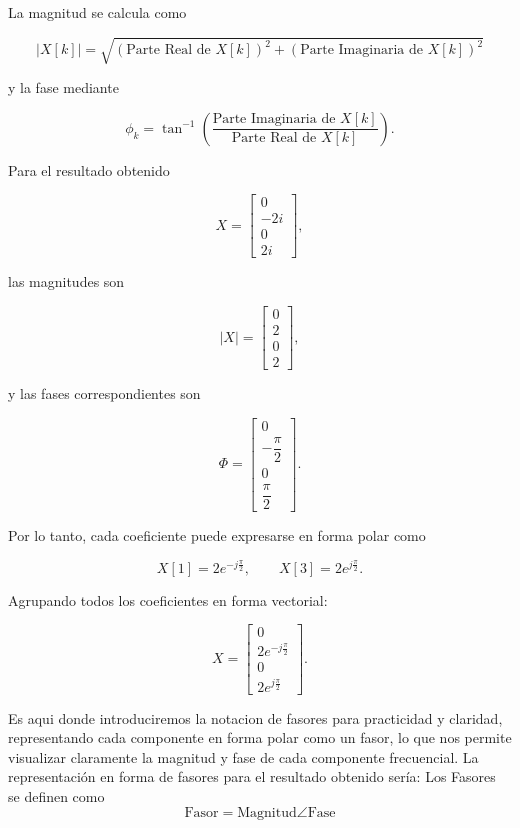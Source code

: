 \documentclass[12pt]{article}
\begin{document}
La magnitud se calcula como

$$
|X[k]| =
\sqrt{
(\text{Parte Real de } X[k])^2 +
(\text{Parte Imaginaria de } X[k])^2
}
$$

y la fase mediante

$$
\phi_k =
\tan^{-1}
\left(
\frac{\text{Parte Imaginaria de } X[k]}
{\text{Parte Real de } X[k]}
\right).
$$

Para el resultado obtenido

$$
X =
\begin{bmatrix}
0\\
-2i\\
0\\
2i
\end{bmatrix},
$$

las magnitudes son

$$
|X| =
\begin{bmatrix}
0\\
2\\
0\\
2
\end{bmatrix},
$$

y las fases correspondientes son

$$
\Phi =
\begin{bmatrix}
0\\
-\dfrac{\pi}{2}\\
0\\
\dfrac{\pi}{2}
\end{bmatrix}.
$$

Por lo tanto, cada coeficiente puede expresarse en forma polar como

$$
X[1] = 2e^{-j\frac{\pi}{2}},
\qquad
X[3] = 2e^{j\frac{\pi}{2}}.
$$

Agrupando todos los coeficientes en forma vectorial:

$$
X =
\begin{bmatrix}
0 \\
2e^{-j\frac{\pi}{2}} \\
0 \\
2e^{j\frac{\pi}{2}}
\end{bmatrix}.
$$

Es aqui donde introduciremos la notacion de fasores para practicidad y claridad, representando cada componente en forma polar como un fasor, lo que nos permite visualizar claramente la magnitud y fase de cada componente frecuencial. La representación en forma de fasores para el resultado obtenido sería:
Los Fasores se definen como $$
\text{Fasor} = \text{Magnitud} \angle \text{Fase}
$$
\end{document}
